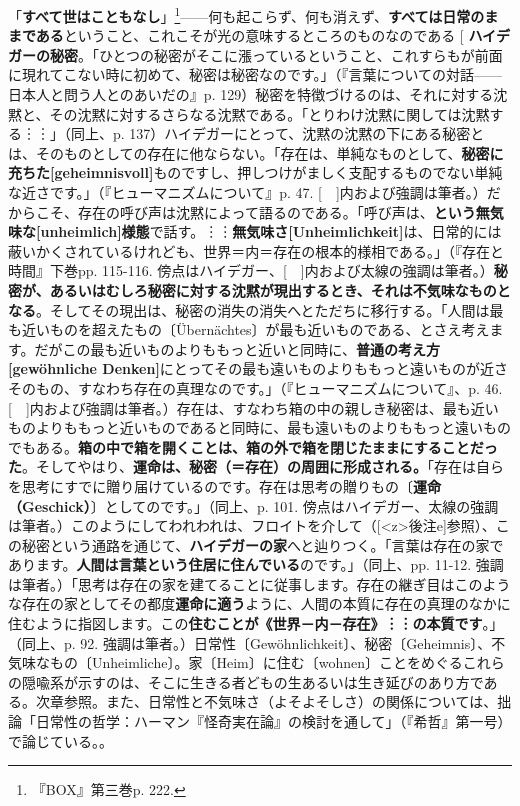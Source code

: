 \documentclass[b5j,twoside,twocolumn]{utarticle}
\makeatletter
\def\yakuchu{%
\@ifnextchar[\@xfootnote %
{\stepcounter{yakuchu}%
\protected@xdef\@thefnmark{\theyakuchu}%
\@footnotemark\@footnotetext}}
\makeatother
\begin{document}
「\textbf{すべて世はこともなし}」\footnote{『BOX』第三巻p. 222.}------何も起こらず、何も消えず、\textbf{すべては日常のままである}ということ、これこそが光の意味するところのものなのである
\yakuchu{\textbf{ハイデガーの秘密}。「ひとつの秘密がそこに漲っているということ、これすらもが前面に現れてこない時に初めて、秘密は秘密なのです。」（『言葉についての対話------日本人と問う人とのあいだの』p. 129）秘密を特徴づけるのは、それに対する沈黙と、その沈黙に対するさらなる沈黙である。「とりわけ沈黙に関しては沈黙する︙︙」（同上、p. 137）ハイデガーにとって、沈黙の沈黙の下にある秘密とは、そのものとしての存在に他ならない。「存在は、単純なものとして、\textbf{秘密に充ちた[geheimnisvoll]}ものですし、押しつけがましく支配するものでない単純な近さです。」（『ヒューマニズムについて』p. 47. [　]内および強調は筆者。）だからこそ、存在の呼び声は沈黙によって語るのである。「呼び声は、\textbf{という無気味な[unheimlich]様態}で話す。︙︙\textbf{無気味さ[Unheimlichkeit]}は、日常的には蔽いかくされているけれども、世界＝内＝存在の根本的様相である。」（『存在と時間』下巻pp. 115-116. 傍点はハイデガー、[　]内および太線の強調は筆者。）\textbf{秘密が、あるいはむしろ秘密に対する沈黙が現出するとき、それは不気味なものとなる}。そしてその現出は、秘密の消失の消失へとただちに移行する。「人間は最も近いものを超えたもの〔\"Ubern\"achtes〕が最も近いものである、とさえ考えます。だがこの最も近いものよりももっと近いと同時に、\textbf{普通の考え方[gewöhnliche Denken]}にとってその最も遠いものよりももっと遠いものが近さそのもの、すなわち存在の真理なのです。」（『ヒューマニズムについて』、p. 46. [　]内および強調は筆者。）存在は、すなわち箱の中の親しき秘密は、最も近いものよりももっと近いものであると同時に、最も遠いものよりももっと遠いものでもある。\textbf{箱の中で箱を開くことは、箱の外で箱を閉じたままにすることだった}。そしてやはり、\textbf{運命は、秘密（＝存在）の周囲に形成される。}「存在は自らを思考にすでに贈り届けているのです。存在は思考の贈りもの〔\textbf{運命（Geschick）}〕としてのです。」（同上、p. 101. 傍点はハイデガー、太線の強調は筆者。）このようにしてわれわれは、フロイトを介して（[\pbox<z>{後注e}]参照）、この秘密という通路を通じて、\textbf{ハイデガーの家}へと辿りつく。「言葉は存在の家であります。\textbf{人間は言葉という住居に住んでいる}のです。」（同上、pp. 11-12. 強調は筆者。）「思考は存在の家を建てることに従事します。存在の継ぎ目はこのような存在の家としてその都度\textbf{運命に適う}ように、人間の本質に存在の真理のなかに住むように指図します。この\textbf{住むことが《世界－内－存在》︙︙の本質です}。」（同上、p. 92. 強調は筆者。）日常性〔Gew\"ohnlichkeit〕、秘密〔Geheimnis〕、不気味なもの〔Unheimliche〕。家〔Heim〕に住む〔wohnen〕ことをめぐるこれらの隠喩系が示すのは、そこに生きる者どもの生あるいは生き延びのあり方である。次章参照。また、日常性と不気味さ（よそよそしさ）の関係については、拙論「日常性の哲学：ハーマン『怪奇実在論』の検討を通して」（『希哲』第一号）で論じている。}。
\end{document}
